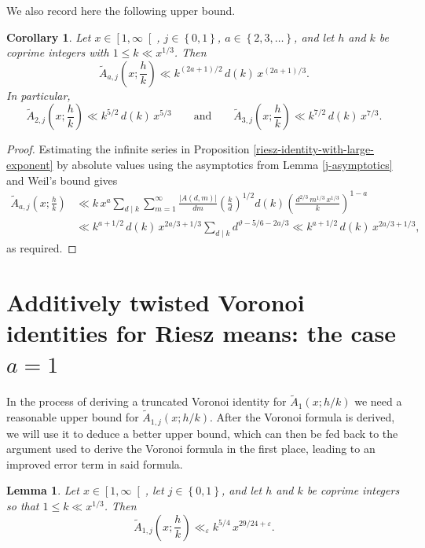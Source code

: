 \documentclass[a4paper,10pt,twoside]{amsart}
\newtheorem{corollary}[theorem]{Corollary}
\newtheorem{lemma}[theorem]{Lemma}
\theoremstyle{definition}
\numberwithin{equation}{section}
\newcommand\eps{\varepsilon}
\renewcommand\:{\colon}
\begin{document}
\noindent We also record here the following upper bound. 
\begin{corollary}\label{a2bound}
Let $x\in\left[1,\infty\right[$, $j\in\left\{0,1\right\}$, $a\in\left\{2,3,\ldots\right\}$, and let $h$ and $k$ be coprime integers with $1\leqslant k\ll x^{1/3}$. Then
\[\widetilde A_{a,j}\!\left(x;\frac hk\right)\ll k^{(2a+1)/2}\,d(k)\,x^{(2a+1)/3}.\]
In particular,
\[\widetilde A_{2,j}\!\left(x;\frac hk\right)\ll k^{5/2}\,d(k)\,x^{5/3}
\qquad\text{and}\qquad
\widetilde A_{3,j}\!\left(x;\frac hk\right)\ll k^{7/2}\,d(k)\,x^{7/3}.\]
\end{corollary}

\begin{proof}
Estimating the infinite series in Proposition \ref{riesz-identity-with-large-exponent} by absolute values using the asymptotics from Lemma \ref{j-asymptotics} and Weil's bound gives
\begin{align*}
\widetilde A_{a,j}\!\left(x;\frac hk\right)
&\ll k\,x^a\sum_{d\mid k}\sum_{m=1}^\infty\frac{\left|A(d,m)\right|}{dm}\left(\frac kd\right)^{1/2}d(k)\left(\frac{d^{2/3}\,m^{1/3}\,x^{1/3}}k\right)^{1-a}\\
&\ll k^{a+1/2}\,d(k)\,x^{2a/3+1/3}\sum_{d\mid k}d^{\vartheta-5/6-2a/3}
\ll k^{a+1/2}\,d(k)\,x^{2a/3+1/3},
\end{align*}
as required. 
\end{proof}

\section{Additively twisted Voronoi identities for Riesz means: the case $a=1$}

\noindent In the process of deriving a truncated Voronoi identity for $\widetilde A_1(x;h/k)$ we need a reasonable upper bound for $\widetilde A_{1,j}(x;h/k)$. After the Voronoi formula is derived, we will use it to deduce a better upper bound, which can then be fed back to the argument used to derive the Voronoi formula in the first place, leading to an improved error term in said formula. 
\begin{lemma}\label{simple-a1bound}
Let $x\in\left[1,\infty\right[$, let $j\in\left\{0,1\right\}$, and let $h$ and $k$ be coprime integers so that $1\leqslant k\ll x^{1/3}$. Then
\[\widetilde A_{1,j}\!\left(x;\frac hk\right)\ll_\eps k^{5/4}\,x^{29/24+\varepsilon}.\]
\end{lemma}
\end{document}
